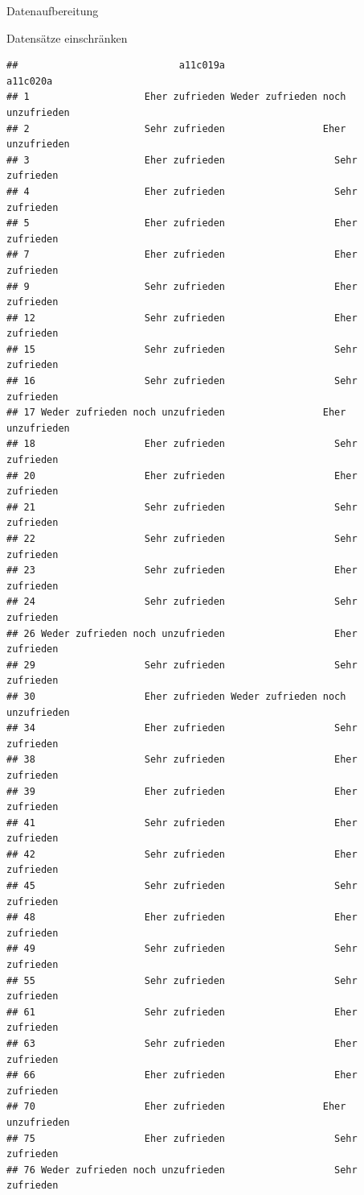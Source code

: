 \documentclass[ignorenonframetext,]{beamer}
\begin{document}
\begin{frame}[fragile]{Datenaufbereitung}
\begin{block}{Datensätze einschränken}
\begin{verbatim}
##                            a11c019a                         a11c020a
## 1                    Eher zufrieden Weder zufrieden noch unzufrieden
## 2                    Sehr zufrieden                 Eher unzufrieden
## 3                    Eher zufrieden                   Sehr zufrieden
## 4                    Eher zufrieden                   Sehr zufrieden
## 5                    Eher zufrieden                   Eher zufrieden
## 7                    Eher zufrieden                   Eher zufrieden
## 9                    Sehr zufrieden                   Eher zufrieden
## 12                   Sehr zufrieden                   Eher zufrieden
## 15                   Sehr zufrieden                   Sehr zufrieden
## 16                   Sehr zufrieden                   Sehr zufrieden
## 17 Weder zufrieden noch unzufrieden                 Eher unzufrieden
## 18                   Eher zufrieden                   Sehr zufrieden
## 20                   Eher zufrieden                   Eher zufrieden
## 21                   Sehr zufrieden                   Sehr zufrieden
## 22                   Sehr zufrieden                   Sehr zufrieden
## 23                   Sehr zufrieden                   Eher zufrieden
## 24                   Sehr zufrieden                   Sehr zufrieden
## 26 Weder zufrieden noch unzufrieden                   Eher zufrieden
## 29                   Sehr zufrieden                   Sehr zufrieden
## 30                   Eher zufrieden Weder zufrieden noch unzufrieden
## 34                   Eher zufrieden                   Sehr zufrieden
## 38                   Sehr zufrieden                   Eher zufrieden
## 39                   Eher zufrieden                   Eher zufrieden
## 41                   Sehr zufrieden                   Eher zufrieden
## 42                   Sehr zufrieden                   Eher zufrieden
## 45                   Sehr zufrieden                   Sehr zufrieden
## 48                   Eher zufrieden                   Eher zufrieden
## 49                   Sehr zufrieden                   Sehr zufrieden
## 55                   Sehr zufrieden                   Sehr zufrieden
## 61                   Sehr zufrieden                   Eher zufrieden
## 63                   Sehr zufrieden                   Eher zufrieden
## 66                   Eher zufrieden                   Eher zufrieden
## 70                   Eher zufrieden                 Eher unzufrieden
## 75                   Eher zufrieden                   Sehr zufrieden
## 76 Weder zufrieden noch unzufrieden                   Sehr zufrieden

\end{verbatim}
\end{block}
\end{frame}
\end{document}
